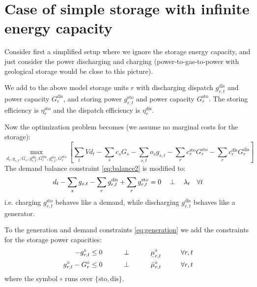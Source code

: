 \documentclass[final,3p,times]{elsarticle}
\newcommand{\ubar}[1]{\text{\b{$#1$}}}
\def\l{\lambda}
\begin{document}
\section{Case of simple storage with infinite energy capacity}\label{sec:simple}

Consider first a simplified setup where we ignore the storage energy
capacity, and just consider the power discharging and charging
(power-to-gas-to-power with geological storage would be close to this
picture).

We add to the above model storage units $r$ with discharging dispatch $g^{\textrm{dis}}_{r,t}$ and power capacity $G^{\textrm{dis}}_{r}$, and storing power $g^{\textrm{sto}}_{r,t}$ and power capacity $G^{\textrm{sto}}_{r}$. The storing efficiency is $\eta_r^{\textrm{sto}}$ and the dispatch efficiency is $\eta_r^{\textrm{dis}}$.

Now the optimization problem becomes (we assume no marginal costs for the storage):
\begin{equation}
    \max_{d_{t}, g_{s,t}, G_s,g^{\textrm{dis}}_{r,t},G^{\textrm{dis}}_{r},g^{\textrm{sto}}_{r,t},G^{\textrm{sto}}_{r}}\left[\sum_{t} Vd_{t} -  \sum_s c_s G_s - \sum_{s,t} o_{s} g_{s,t} -\sum_r c^{\textrm{sto}}_r G^{\textrm{sto}}_r -\sum_r c^{\textrm{dis}}_r G^{\textrm{dis}}_r\right]  \label{eq:objsr}
\end{equation}
The demand balance constraint \eqref{eq:balance2} is modified to:
\begin{align}
   d_{t} - \sum_s g_{s,t} - \sum_r g^{\textrm{dis}}_{r,t} + \sum_r g^{\textrm{sto}}_{r,t}  =  0 \hspace{0.34cm}\perp \hspace{0.34cm} \l_t \hspace{0.34cm} \forall t \label{eq:balance3}
\end{align}
i.e. charging $g^{\textrm{sto}}_{r,t}$ behaves like a demand, while discharging $g^{\textrm{dis}}_{r,t}$ behaves like a generator.

To the generation and demand constraints \eqref{eq:generation} we add the constraints for the storage power capacities:
\begin{align}
    -g^\circ_{r,t}\leq 0 \hspace{1cm}\perp \hspace{1cm} \ubar{\mu}^\circ_{r,t} \hspace{1cm} \forall r,t  \label{eq:storlower2}\\
    g^\circ_{r,t} - G^\circ_r \leq 0 \hspace{1cm}\perp \hspace{1cm} \bar{\mu}^\circ_{r,t} \hspace{1cm} \forall r,t \label{eq:storupper2}
\end{align}
where the symbol $\circ$ runs over $\{\textrm{sto},\textrm{dis}\}$.
\end{document}
